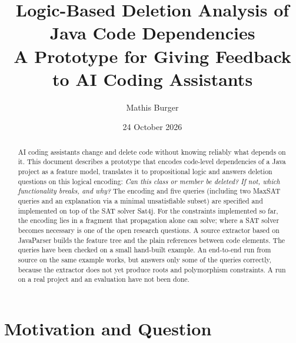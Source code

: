 \documentclass[11pt,a4paper]{article}
\title{Logic-Based Deletion Analysis of Java Code Dependencies\\[0.3em]
\large A Prototype for Giving Feedback to AI Coding Assistants}
\author{Mathis Burger}
\date{24 October 2026}
\begin{document}
\maketitle

\begin{abstract}
AI coding assistants change and delete code without knowing reliably what
depends on it. This document describes a prototype that encodes code-level
dependencies of a Java project as a feature model, translates it to
propositional logic and answers deletion questions on this logical
encoding: \emph{Can this class or member be deleted? If not, which
functionality breaks, and why?} The encoding and five queries (including
two MaxSAT queries and an explanation via a minimal unsatisfiable subset)
are specified and implemented on top of the SAT solver Sat4j. For the
constraints implemented so far, the encoding lies in a fragment that
propagation alone can solve; where a SAT solver becomes necessary is one
of the open research questions. A source extractor based on
JavaParser builds the feature tree and the plain references between code
elements. The queries have been checked on a small hand-built example.
An end-to-end run from source on the same example works, but answers only
some of the queries correctly, because the extractor does not yet produce
roots and polymorphism constraints. A run on a real project and an
evaluation have not been done.
\end{abstract}

\begin{center}
\end{center}

\section{Motivation and Question}
\end{document}
